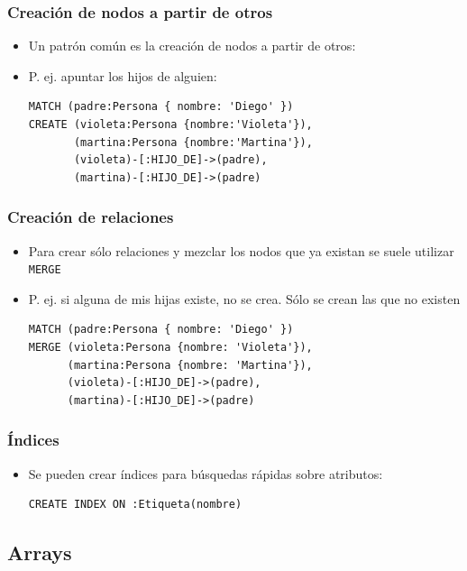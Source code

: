 \documentclass[14pt]{beamer}
\begin{document}
\begin{frame}
\begin{itemize}
\begin{frame}[fragile]
  \frametitle{Creación de nodos a partir de otros}
  \begin{itemize}
  \item Un patrón común es la creación de nodos a partir de otros:
\item P. ej. apuntar los hijos de alguien:
\begin{lstlisting}[language=cypher]
MATCH (padre:Persona { nombre: 'Diego' })
CREATE (violeta:Persona {nombre:'Violeta'}),
       (martina:Persona {nombre:'Martina'}),
       (violeta)-[:HIJO_DE]->(padre),
       (martina)-[:HIJO_DE]->(padre)
\end{lstlisting}
  \end{itemize}
\end{frame}

\begin{frame}[fragile]
  \frametitle{Creación de relaciones}
  \begin{itemize}
  \item Para crear sólo relaciones y mezclar los nodos que ya existan se
    suele utilizar {\tt MERGE}
\item P. ej. si alguna de mis hijas existe, no se crea. Sólo se crean las
  que no existen
\begin{lstlisting}[language=cypher]
MATCH (padre:Persona { nombre: 'Diego' })
MERGE (violeta:Persona {nombre: 'Violeta'}),
      (martina:Persona {nombre: 'Martina'}),
      (violeta)-[:HIJO_DE]->(padre),
      (martina)-[:HIJO_DE]->(padre)
\end{lstlisting}
  \end{itemize}
\end{frame}


\begin{frame}[fragile]
  \frametitle{Índices}
  \begin{itemize}
  \item Se pueden crear índices para búsquedas rápidas sobre atributos:
\begin{lstlisting}[language=cypher]
CREATE INDEX ON :Etiqueta(nombre)
\end{lstlisting}
  \end{itemize}
\end{frame}



\subsection{Arrays}


\end{itemize}
\end{frame}
\end{document}
